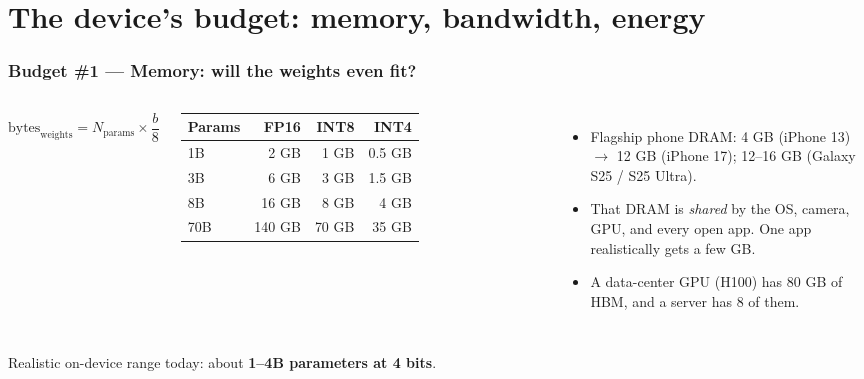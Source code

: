 
\section[Budget]{The device's budget: memory, bandwidth, energy}
\begin{frame}
\frametitle{Budget \#1 --- Memory: will the weights even fit?}
\begin{columns}[T]
\[ \text{bytes}_{\text{weights}} = N_{\text{params}}\times\frac{b}{8} \]
\centering
\begin{tabular}{@{}lrrr@{}}
\toprule
Params & FP16 & INT8 & INT4 \\
\midrule
1B  & 2 GB   & 1 GB  & 0.5 GB \\
3B  & 6 GB   & 3 GB  & 1.5 GB \\
8B  & 16 GB  & 8 GB  & 4 GB \\
70B & 140 GB & 70 GB & 35 GB \\
\bottomrule
\end{tabular}
\vspace{2pt}
\begin{itemize}\setlength{\itemsep}{4pt}
  \item Flagship phone DRAM: 4 GB (iPhone 13) $\rightarrow$ 12 GB (iPhone 17); 12--16 GB (Galaxy S25 / S25 Ultra).
  \item That DRAM is \emph{shared} by the OS, camera, GPU, and every open app. One app realistically gets a few GB.
  \item A data-center GPU (H100) has 80 GB of HBM, and a server has 8 of them.
\end{itemize}
\end{columns}
\vspace{8pt}
\begin{alertblock}{}
\centering Realistic on-device range today: about \textbf{1--4B parameters at 4 bits}.
\end{alertblock}
\end{frame}

